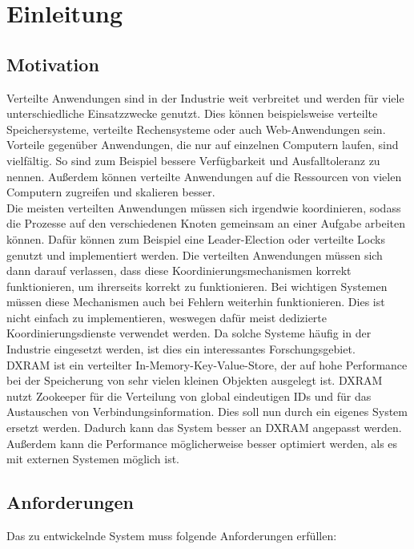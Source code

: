  \chapter{Einleitung}

\section{Motivation}

Verteilte Anwendungen sind in der Industrie weit verbreitet und werden für viele unterschiedliche Einsatzzwecke genutzt. Dies können beispielsweise verteilte Speichersysteme, verteilte Rechensysteme oder auch Web-Anwendungen sein. Vorteile gegenüber Anwendungen, die nur auf einzelnen Computern laufen, sind vielfältig. So sind zum Beispiel bessere Verfügbarkeit und Ausfalltoleranz zu nennen. Außerdem können verteilte Anwendungen auf die Ressourcen von vielen Computern zugreifen und skalieren besser. \\
Die meisten verteilten Anwendungen müssen sich irgendwie koordinieren, sodass die Prozesse auf den verschiedenen Knoten gemeinsam an einer Aufgabe arbeiten können. Dafür können zum Beispiel eine Leader-Election oder verteilte Locks genutzt und implementiert werden. Die verteilten Anwendungen müssen sich dann darauf verlassen, dass diese Koordinierungsmechanismen korrekt funktionieren, um ihrerseits korrekt zu funktionieren. Bei wichtigen Systemen müssen diese Mechanismen auch bei Fehlern weiterhin funktionieren. Dies ist nicht einfach zu implementieren, weswegen dafür meist dedizierte Koordinierungsdienste verwendet werden. Da solche Systeme häufig in der Industrie eingesetzt werden, ist dies ein interessantes Forschungsgebiet. \\
DXRAM \cite{dxram} ist ein verteilter In-Memory-Key-Value-Store, der auf hohe Performance bei der Speicherung von sehr vielen kleinen Objekten ausgelegt ist. DXRAM nutzt Zookeeper \cite{zookeeper} für die Verteilung von global eindeutigen IDs und für das Austauschen von Verbindungsinformation. Dies soll nun durch ein eigenes System ersetzt werden. Dadurch kann das System besser an DXRAM angepasst werden. Außerdem kann die Performance möglicherweise besser optimiert werden, als es mit externen Systemen möglich ist.

\section{Anforderungen}

Das zu entwickelnde System muss folgende Anforderungen erfüllen:

